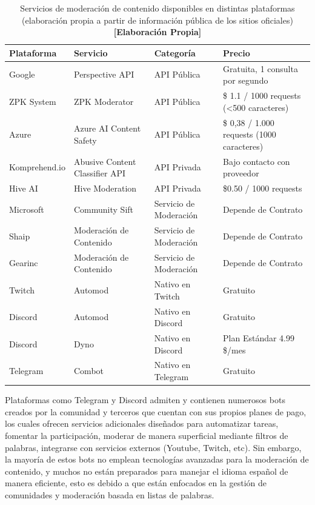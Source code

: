 \begin{table}[h!]
    \centering
    \small
    \begin{tabular}{|>{\raggedright\arraybackslash}p{2.5cm}|>{\raggedright\arraybackslash}p{3.6cm}|>{\raggedright\arraybackslash}p{2.8cm}|>{\raggedright\arraybackslash}p{3.8cm}|}
        \hline
        \textbf{Plataforma} & \textbf{Servicio} & \textbf{Categoría} & \textbf{Precio} \\
        \hline
        Google & Perspective API & API Pública & Gratuita, 1 consulta por segundo \\
        ZPK System & ZPK Moderator & API Pública & \$ 1.1 / 1000 requests (<500 caracteres) \\
        Azure & Azure AI Content Safety & API Pública & \$ 0,38 / 1.000 requests (1000 caracteres) \\
        Komprehend.\allowbreak io & Abusive Content Classifier API & API Privada & Bajo contacto con proveedor \\
        Hive AI & Hive Moderation & API Privada & \$0.50 / 1000 requests \\
        Microsoft & Community Sift & Servicio de Moderación & Depende de Contrato \\
        Shaip & Moderación de Contenido & Servicio de Moderación & Depende de Contrato \\
        Gearinc & Moderación de Contenido & Servicio de Moderación & Depende de Contrato \\
        Twitch & Automod & Nativo en Twitch & Gratuito \\
        Discord & Automod & Nativo en Discord & Gratuito \\
        Discord & Dyno & Nativo en Discord & Plan Estándar 4.99 \$/mes \\
        Telegram & Combot & Nativo en Telegram & Gratuito \\
        \hline
    \end{tabular}
    \caption{Servicios de moderación de contenido disponibles en distintas plataformas (elaboración propia a partir de información pública de los sitios oficiales) \textbf{[Elaboración Propia]}}
\end{table}

Plataformas como Telegram y Discord admiten y contienen numerosos bots creados por la comunidad y terceros que cuentan con sus propios planes de pago, los cuales ofrecen servicios adicionales diseñados para automatizar tareas, fomentar la participación, moderar de manera superficial mediante filtros de palabras, integrarse con servicios externos (Youtube, Twitch, etc). Sin embargo, la mayoría de estos bots no emplean tecnologías avanzadas para la moderación de contenido, y muchos no están preparados para manejar el idioma español de manera eficiente, esto es debido a que están enfocados en la gestión de comunidades y moderación basada en listas de palabras.

